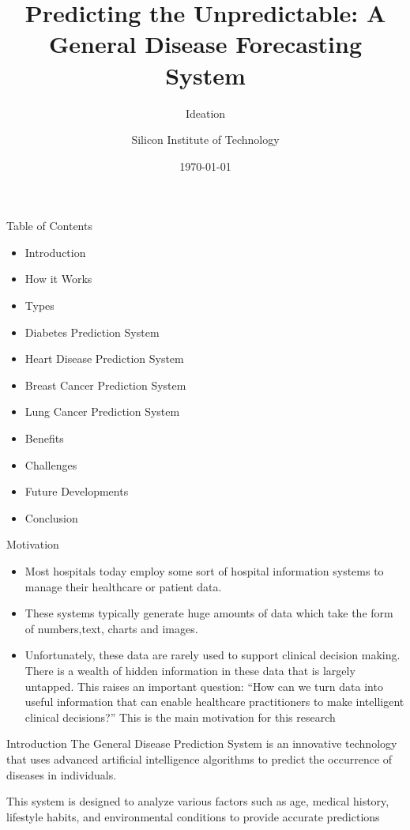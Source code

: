 \documentclass{SKP-beamer}
\title[General Disease Prediction System]{Predicting the Unpredictable: A General Disease Forecasting System}
\subtitle{Ideation}
\author{Silicon Institute of Technology}
\institute[SBP]{
  DEPARTMENT OF COMPUTER SCIENCE AND ENGINEERING
}
\date{\today}
\begin{document}
\begin{frame}
  \titlepage
\end{frame}


\begin{frame}{Table of Contents}
	\begin{itemize}
		\item Introduction
		\item How it Works
		\item Types
		\item Diabetes Prediction System
		\item Heart Disease Prediction System
		\item Breast Cancer Prediction System
		\item Lung Cancer Prediction System
		\item Benefits
		\item Challenges
		\item Future Developments
		\item Conclusion
	\end{itemize}
\end{frame}

\begin{frame}{Motivation}
	\begin{itemize}
		\item Most hospitals today employ some sort of hospital information systems to manage their healthcare or patient data. 
		\item These systems typically generate huge amounts of data which take the form of numbers,text, charts and images. 
		\item Unfortunately, these data are rarely used to support clinical decision making. There is a wealth of hidden information in these data that is largely untapped. This raises an important question:
	   “How can we turn data into useful information that can
	   enable healthcare practitioners to make intelligent
	   clinical decisions?” This is the main motivation for this
	research
\end{itemize}
\end{frame}

\begin{frame}{Introduction}
  The General Disease Prediction System is an innovative technology that uses advanced artificial intelligence algorithms to predict the occurrence of diseases in individuals.
  
  This system is designed to analyze various factors such as age, medical history, lifestyle habits, and environmental conditions to provide accurate predictions
\end{frame}
\end{document}
